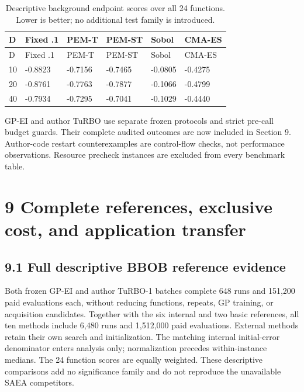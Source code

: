 \documentclass[11pt,a4paper]{article}
\begin{document}
\par\noindent\begin{minipage}{\linewidth}

\begin{longtable}[]{@{}llllll@{}}
\caption{Descriptive background endpoint scores over all 24 functions.
Lower is better; no additional test family is
introduced.}\tabularnewline
\toprule
D & Fixed .1 & PEM-T & PEM-ST & Sobol & CMA-ES \\
\midrule
\endfirsthead
\toprule
D & Fixed .1 & PEM-T & PEM-ST & Sobol & CMA-ES \\
\midrule
\endhead
10 & -0.8823 & -0.7156 & -0.7465 & -0.0805 & -0.4275 \\
20 & -0.8761 & -0.7763 & -0.7877 & -0.1066 & -0.4799 \\
40 & -0.7934 & -0.7295 & -0.7041 & -0.1029 & -0.4440 \\
\bottomrule
\end{longtable}

\end{minipage}\par

GP-EI and author TuRBO use separate frozen protocols and strict pre-call
budget guards. Their complete audited outcomes are now included in
Section 9. Author-code restart counterexamples are control-flow checks,
not performance observations. Resource precheck instances are excluded
from every benchmark table.

\hypertarget{complete-references-exclusive-cost-and-application-transfer}{%
\section{9 Complete references, exclusive cost, and application
transfer}\label{complete-references-exclusive-cost-and-application-transfer}}

\hypertarget{full-descriptive-bbob-reference-evidence}{%
\subsection{9.1 Full descriptive BBOB reference
evidence}\label{full-descriptive-bbob-reference-evidence}}

Both frozen GP-EI and author TuRBO-1 batches complete 648 runs and
151,200 paid evaluations each, without reducing functions, repeats, GP
training, or acquisition candidates. Together with the six internal and
two basic references, all ten methods include 6,480 runs and 1,512,000
paid evaluations. External methods retain their own search and
initialization. The matching internal initial-error denominator enters
analysis only; normalization precedes within-instance medians. The 24
function scores are equally weighted. These descriptive comparisons add
no significance family and do not reproduce the unavailable SAEA
competitors.
\end{document}
